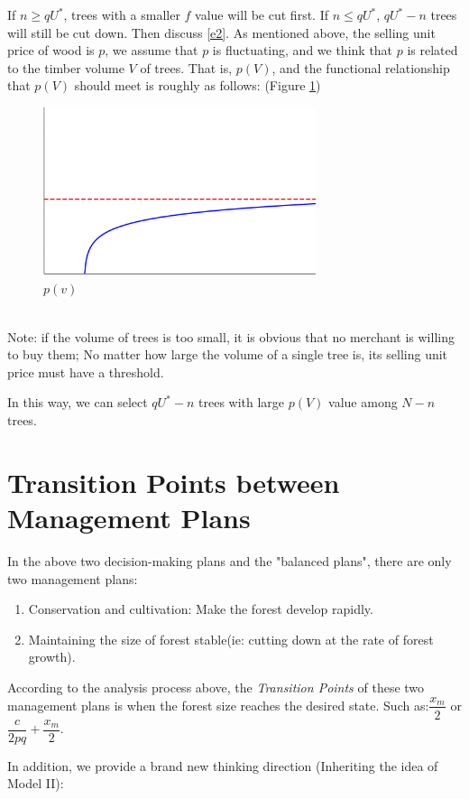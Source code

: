 \documentclass[12pt]{article}
\begin{document}
If $n \geqslant qU^*$, trees with a smaller $f$ value will be cut first. If $n
    \leqslant qU^*$, $qU^*-n$ trees will still be cut down. Then discuss \ref{e2}.
As mentioned above, the selling unit price of wood is $p$, we assume that $p$
is fluctuating, and we think that $p$ is related to the timber volume $V$ of
trees. That is, $p(V)$, and the functional relationship that $p(V)$ should meet
is roughly as follows: (Figure \ref{F2})
\begin{figure}[htb]
    \centering
    \includegraphics[width=8cm]{pV.png}
    \caption{$p(v)$}\label{F2}
\end{figure}\\

Note: if the volume of trees is too small, it is obvious that no merchant is
willing to buy them; No matter how large the volume of a single tree is, its
selling unit price must have a threshold.

In this way, we can select $qU^* - n$ trees with large $p(V)$ value among $N-n$
trees.

\section{Transition Points between Management Plans}
In the above two decision-making plans and the "balanced plans", there are only
two management plans:
\begin{enumerate}
    \item Conservation and cultivation: Make the forest develop rapidly.
    \item Maintaining the size of forest stable(ie: cutting down at the rate of forest
          growth).
\end{enumerate}
According to the analysis process above,
the \emph{Transition Points} of these two management plans is when the forest size reaches the desired state.
Such as:$\dfrac{x_m}{2}$ or $\dfrac{c}{2pq}+\dfrac{x_m}{2}$.

In addition, we provide a brand new thinking direction (Inheriting the idea of
Model II):
\end{document}
